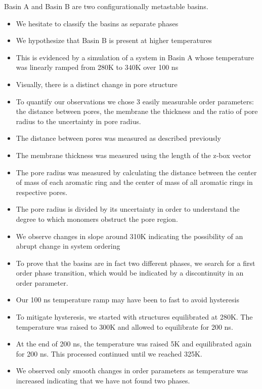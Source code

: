 Basin A and Basin B are two configurationally metastable basins. 
\begin{itemize}
	\item We hesitate to classify the basins as separate phases
	\item We hypothesize that Basin B is present at higher temperatures
	\item This is evidenced by a simulation of a system in Basin A whose temperature was linearly ramped from 280K to 340K over 100 ns
	\item Visually, there is a distinct change in pore structure
	\item To quantify our observations we chose 3 easily measurable order parameters: the distance between pores, the membrane the thickness and the ratio of pore radius to the uncertainty in pore radius.
	\item The distance between pores was measured as described previously
	\item The membrane thickness was measured using the length of the z-box vector
	\item The pore radius was measured by calculating the distance between the center of mass of each aromatic ring and the center of mass of all aromatic rings in respective pores.
	\item The pore radius is divided by its uncertainty in order to understand the degree to which monomers obstruct the pore region.
	\item We observe changes in slope around 310K indicating the possibility of an abrupt change in system ordering
	\item To prove that the basins are in fact two different phases, we search for a first order phase transition, which would be indicated by a discontinuity in an order parameter.
	\item Our 100 ns temperature ramp may have been to fast to avoid hysteresis
	\item To mitigate hysteresis, we started with structures equilibrated at 280K. The temperature was raised to 300K and allowed to equilibrate for 200 ns.
	\item At the end of 200 ns, the temperature was raised 5K and equilibrated again for 200 ns. This processed continued until we reached 325K. 
	\item We observed only smooth changes in order parameters as temperature was increased indicating that we have not found two phases.
\end{itemize}

